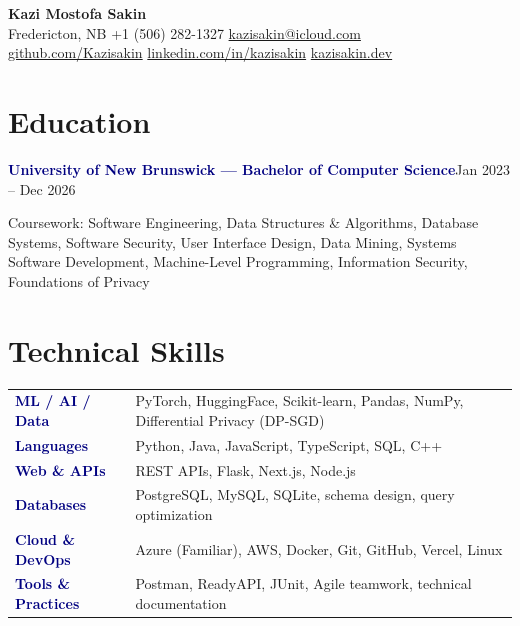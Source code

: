 \documentclass[11.5pt, letterpaper]{article}
\newcommand{\entry}[2]{\vspace{6pt}\noindent\textcolor{navy}{\bfseries #1}\hfill\textcolor{meta}{#2}\par}
\newcommand{\sub}[1]{\noindent\textcolor{meta}{#1}\par\vspace{4pt}}
\newcommand{\skillrow}[2]{\textcolor{navy}{\bfseries #1} & #2 \\[5pt]}
\begin{document}
\begin{center}
  {\sffamily\bfseries\fontsize{25}{27}\selectfont Kazi Mostofa Sakin}\\[6pt]
  \small
  Fredericton, NB \enspace\textcolor{meta}{\textbullet}\enspace
  +1 (506) 282-1327 \enspace\textcolor{meta}{\textbullet}\enspace
  \href{mailto:kazisakin@icloud.com}{kazisakin@icloud.com}\\[2pt]
  \href{https://github.com/Kazisakin}{github.com/Kazisakin} \enspace\textcolor{meta}{\textbullet}\enspace
  \href{https://linkedin.com/in/kazisakin}{linkedin.com/in/kazisakin} \enspace\textcolor{meta}{\textbullet}\enspace
  \href{https://kazisakin.dev}{kazisakin.dev}
\end{center}
\vspace{4pt}

\section{Education}
\entry{University of New Brunswick --- Bachelor of Computer Science}{Jan 2023 -- Dec 2026}
\sub{Coursework: Software Engineering, Data Structures \& Algorithms, Database Systems, Software Security, User Interface Design, Data Mining, Systems Software Development, Machine-Level Programming, Information Security, Foundations of Privacy}

\section{Technical Skills}
\begin{tabularx}{\linewidth}{@{}>{\raggedright\arraybackslash}p{1.9in} X@{}}
  \skillrow{ML / AI / Data}{PyTorch, HuggingFace, Scikit-learn, Pandas, NumPy, Differential Privacy (DP-SGD)}
  \skillrow{Languages}{Python, Java, JavaScript, TypeScript, SQL, C++}
  \skillrow{Web \& APIs}{REST APIs, Flask, Next.js, Node.js}
  \skillrow{Databases}{PostgreSQL, MySQL, SQLite, schema design, query optimization}
  \skillrow{Cloud \& DevOps}{Azure (Familiar), AWS, Docker, Git, GitHub, Vercel, Linux}
  \textbf{\textcolor{navy}{Tools \& Practices}} & Postman, ReadyAPI, JUnit, Agile teamwork, technical documentation \\
\end{tabularx}

\end{document}
